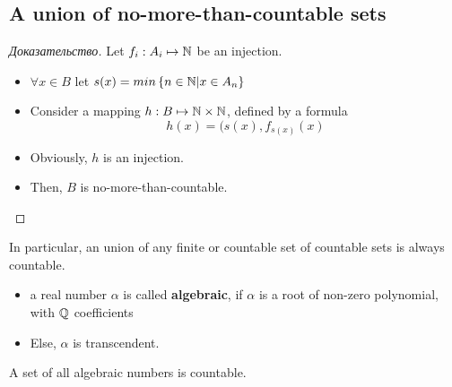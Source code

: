 \subsection{A union of no-more-than-countable sets}

\begin{proof}[Доказательство]
	Let $f_i: A_i \mapsto \mathbb{N}$ be an injection.
	\begin{itemize}
		\item $\forall x \in B$ let $s(x) = min \left\{ n \in \mathbb{N} | x \in A_{n} \right \} $
		\item Consider a mapping $h: B \mapsto \mathbb{N} \times \mathbb{N}$, defined by a formula \[
				h(x) = (s(x), f_{s(x)}(x)
			\]
	 
		\item Obviously, $h$ is an injection.
		\item Then, $B$ is no-more-than-countable. 
	\end{itemize}
\end{proof}
\begin{note}
	In particular, an union of any finite or countable set of countable sets is always countable.
\end{note}


\begin{definition}[]
	\begin{itemize}
		\item a real number $\alpha$ is called \textbf{algebraic}, if $\alpha$ is a root of non-zero polynomial, with $\mathbb{Q}$ coefficients
		\item Else, $\alpha$ is transcendent. 
	\end{itemize}
\end{definition}

\begin{exercise}
	A set of all algebraic numbers is countable.
\end{exercise}
